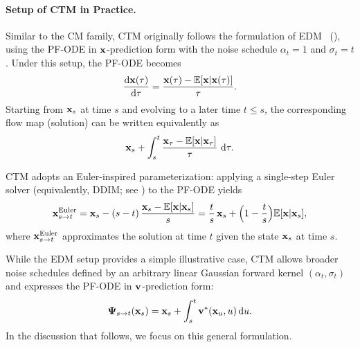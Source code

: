 \paragraph{Setup of CTM in Practice.}
Similar to the CM family, CTM originally follows the formulation of EDM~\citep{karras2022elucidating} (), 
using the PF-ODE in ${\mathbf{x}}$-prediction form with the noise schedule 
$\alpha_t = 1$ and $\sigma_t = t$. 
Under this setup, the PF-ODE becomes
\begin{align*}
    \frac{\mathop{}\!\mathrm{d} {\mathbf{x}}(\tau)}{\mathop{}\!\mathrm{d} \tau} 
    = \frac{{\mathbf{x}}(\tau) - \mathbb{E}[{\mathbf{x}}|{\mathbf{x}}(\tau)]}{\tau}.
\end{align*}
Starting from ${\mathbf{x}}_s$ at time $s$ and evolving to a later time $t \le s$, 
the corresponding flow map (solution) can be written equivalently as
\begin{align*}
{\mathbf{x}}_s + \int_s^t 
    \frac{{\mathbf{x}}_\tau - \mathbb{E}[{\mathbf{x}} |{\mathbf{x}}_\tau]}{\tau}\, \mathop{}\!\mathrm{d} \tau.
\end{align*}

CTM adopts an Euler-inspired parameterization: 
applying a single-step Euler solver (equivalently, DDIM; see ) to the PF-ODE yields
\[
{\mathbf{x}}_{s\to t}^{\mathrm{Euler}}
= {\mathbf{x}}_s - (s-t)\,\frac{{\mathbf{x}}_s - \mathbb{E}[{\mathbf{x}}|{\mathbf{x}}_s]}{s}
= \frac{t}{s}\,{\mathbf{x}}_s + \Big(1 - \frac{t}{s}\Big)\mathbb{E}[{\mathbf{x}}|{\mathbf{x}}_s],
\]
where ${\mathbf{x}}_{s\to t}^{\mathrm{Euler}}$ approximates the solution at time $t$ given the state ${\mathbf{x}}_s$ at time $s$.

While the EDM setup provides a simple illustrative case, 
CTM allows broader noise schedules defined by an arbitrary linear Gaussian forward kernel $(\alpha_t, \sigma_t)$ 
and expresses the PF-ODE in ${\mathbf{v}}$-prediction form:
\[
{\bm{\Psi}}_{s\to t}({\mathbf{x}}_s)
= {\mathbf{x}}_s + \int_s^t {\mathbf{v}}^*({\mathbf{x}}_u,u) \mathop{}\!\mathrm{d} u.
\]
In the discussion that follows, we focus on this general formulation.


